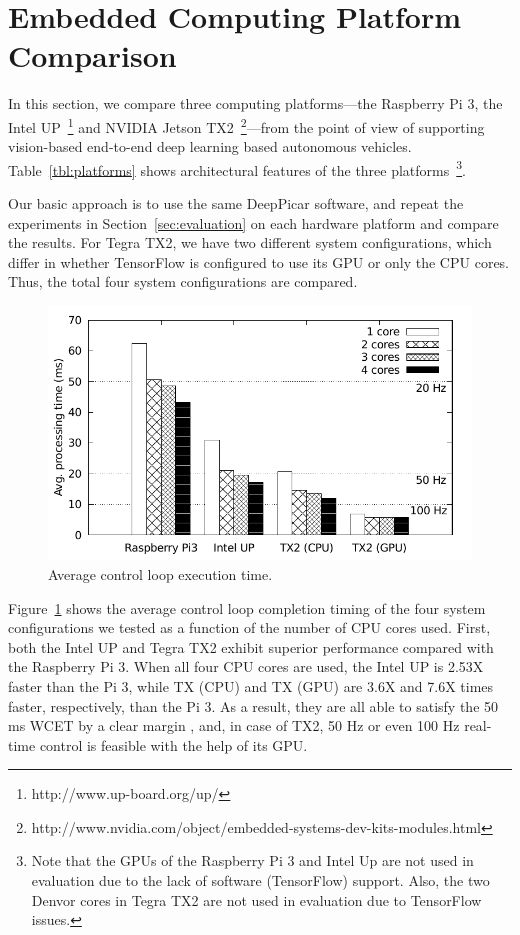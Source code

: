 
%

\section{Embedded Computing Platform Comparison}\label{sec:comparison}

In this section, we compare three computing platforms---the Raspberry
Pi 3, the Intel UP~\footnote{http://www.up-board.org/up/} and NVIDIA
Jetson
TX2~\footnote{http://www.nvidia.com/object/embedded-systems-dev-kits-modules.html}---from
the point of view of supporting vision-based end-to-end deep learning
based autonomous vehicles. 
Table~\ref{tbl:platforms} shows architectural features of the three
platforms~\footnote{Note that the GPUs of the Raspberry Pi 3 and Intel
  Up are not used in evaluation due to the lack of software (TensorFlow)
support. Also, the two Denvor cores in Tegra TX2 are not used in
evaluation due to TensorFlow issues.}.
  
Our basic approach is to use the same DeepPicar software, and repeat
the experiments in Section~\ref{sec:evaluation} on each hardware
platform and compare the results. 
For Tegra TX2, we have two different system configurations,
which differ in whether TensorFlow is configured to use its GPU or
only the CPU cores. Thus, the total four system configurations are
compared.

\begin{figure}[h]
  \centering
  \includegraphics[width=.5\textwidth]{figs/compare_core}
  \caption{Average control loop execution time.} 
  \label{fig:sys_core}
\end{figure}

Figure~\ref{fig:sys_core} shows the average control loop completion
timing of the four system configurations we tested as a function of
the number of CPU cores used.
First, both the Intel UP and Tegra TX2 exhibit superior performance
compared with the Raspberry Pi 3. 
When all four CPU cores are used, the Intel UP is 2.53X faster than
the Pi 3, while TX (CPU) and TX (GPU) are 3.6X and 7.6X times faster,
respectively, than the Pi 3. 
As a result, they are all able to satisfy the 50 ms 
WCET by a clear margin
, and, in case of TX2, 50 Hz or even 100 Hz real-time control is
feasible with the help of its GPU.

